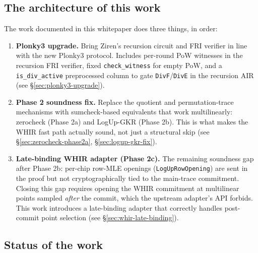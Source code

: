 \subsection{The architecture of this work}

The work documented in this whitepaper does three things, in order:

\begin{enumerate}
  \item \textbf{Plonky3 upgrade.}  Bring Ziren's recursion circuit and
        FRI verifier in line with the new Plonky3 protocol.  Includes
        per-round PoW witnesses in the recursion FRI verifier, fixed
        \texttt{check\_witness} for empty PoW, and a \texttt{is\_div\_active}
        preprocessed column to gate \texttt{DivF}/\texttt{DivE} in the
        recursion AIR (see \S\ref{sec:plonky3-upgrade}).
  \item \textbf{Phase 2 soundness fix.}  Replace the quotient and
        permutation-trace mechanisms with sumcheck-based equivalents
        that work multilinearly: zerocheck (Phase 2a) and LogUp-GKR
        (Phase 2b).  This is what makes the WHIR fast path actually
        sound, not just a structural skip
        (see \S\ref{sec:zerocheck-phase2a}, \S\ref{sec:logup-gkr-fix}).
  \item \textbf{Late-binding WHIR adapter (Phase 2c).}  The remaining
        soundness gap after Phase 2b: per-chip row-MLE openings
        (\texttt{LogUpRowOpening}) are sent in the proof but not
        cryptographically tied to the main-trace commitment.  Closing
        this gap requires opening the WHIR commitment at multilinear
        points sampled \emph{after} the commit, which the upstream
        adapter's API forbids.  This work introduces a late-binding
        adapter that correctly handles post-commit point selection
        (see \S\ref{sec:whir-late-binding}).
\end{enumerate}

\subsection{Status of the work}

